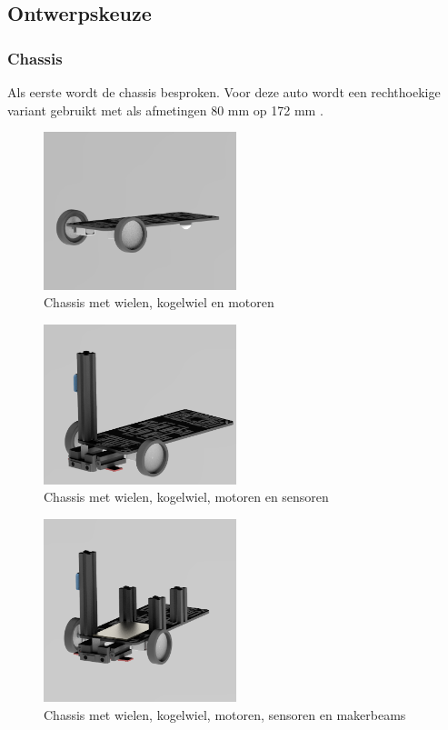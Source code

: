 \documentclass[a4paper,twoside,kulak]{kulakreport} %
\begin{document}
\subsection{Ontwerpskeuze}
\label{Ontwerpskeuze}

\subsubsection{Chassis}
Als eerste wordt de chassis besproken. Voor deze auto wordt een rechthoekige variant gebruikt met als afmetingen 80 mm op 172 mm  \cite{RobotChassisRechthoekigZwart}. 

\begin{figure}
	\includegraphics[width=0.5\textwidth]{1chassisaAndrijving}
	\centering
	\caption{Chassis met wielen, kogelwiel en motoren}
	\label{opbouw1}
\end{figure}

\begin{figure}
	\includegraphics[width=0.5\textwidth]{2sensoren}
	\centering
	\caption{Chassis met wielen, kogelwiel, motoren en sensoren}
	\label{opbouw2}
\end{figure}

\begin{figure}
	\includegraphics[width=0.5\textwidth]{3voorlaatste}
	\centering
	\caption{Chassis met wielen, kogelwiel, motoren, sensoren en makerbeams} 
\label{opbouw3}
\end{figure}
\end{document}
